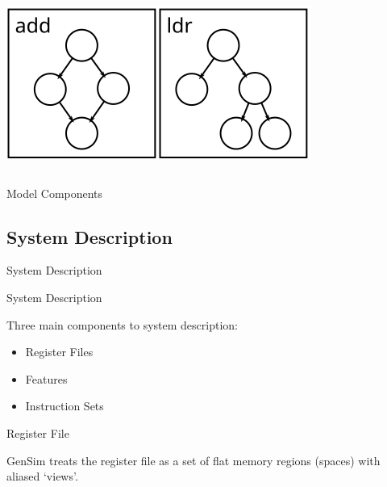 \begin{lrbox}{\modelcomponentsbox}
\begin{columns}
\begin{column}{0.25\textwidth}
\bigskip

\includegraphics[width=\textwidth]{../intro-talk/figures/component-semantics}
\end{column}
\end{columns}

\end{lrbox}

\begin{frame}{Model Components}
\usebox{\modelcomponentsbox}
\smash{}
\end{frame}

\subsection{System Description}

\begin{frame}{System Description}
\usebox{\modelcomponentsbox}
\end{frame}

\begin{frame}{System Description}

Three main components to system description:
\begin{itemize}
\item Register Files
\item Features
\item Instruction Sets
\end{itemize}

\end{frame}

\begin{frame}{Register File}

GenSim treats the register file as a set of flat memory regions (spaces)
with aliased `views'.

\end{frame}

